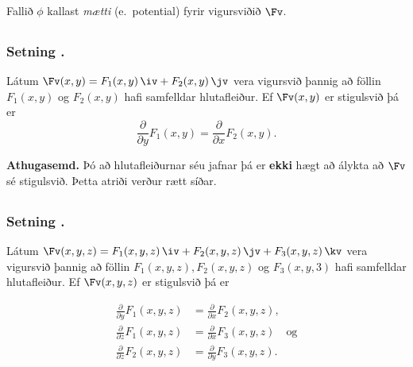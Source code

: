 \medskip
Fallið $\phi$ kallast {\em mætti} (e.~potential) fyrir vigursviðið $\Fv$.






\subsection{} 

\subsubsection{Setning \kaflanr.}
 Látum $\Fv(x,y)=F_1(x,y)\,\iv+F_2(x,y)\,\jv$ vera vigursvið þannig að föllin $F_1(x,y)$ og $F_2(x,y)$ hafi samfelldar hlutafleiður.  Ef $\Fv(x,y)$ er stigulsvið þá er 
$$\frac{\partial}{\partial y}F_1(x,y)=
\frac{\partial}{\partial x}F_2(x,y).$$

\smallskip

{\bf Athugasemd.}  Þó að hlutafleiðurnar séu jafnar
þá er {\bf ekki} hægt að álykta að $\Fv$ sé stigulsvið.  Þetta
atriði verður rætt síðar.
 





\subsection{} 

\subsubsection{Setning \kaflanr.}
Látum
$\Fv(x,y,z)=F_1(x,y,z)\,\iv+F_2(x,y,z)\,\jv+F_3(x,y,z)\,\kv$ vera vigursvið
þannig að föllin $F_1(x,y,z), F_2(x,y,z)$ og $F_3(x,y,3)$ hafi
samfelldar hlutafleiður.  Ef $\Fv(x,y,z)$ er stigulsvið þá er  

\begin {align*}
\frac{\partial}{\partial y}F_1(x,y,z) &=
\frac{\partial}{\partial x}F_2(x,y,z), \\
\frac{\partial}{\partial z}F_1(x,y,z) &=
\frac{\partial}{\partial x}F_3(x,y,z) \quad \text{og} \\
\frac{\partial}{\partial z}F_2(x,y,z)&=
\frac{\partial}{\partial y}F_3(x,y,z).
\end {align*}








\subsection{} 

